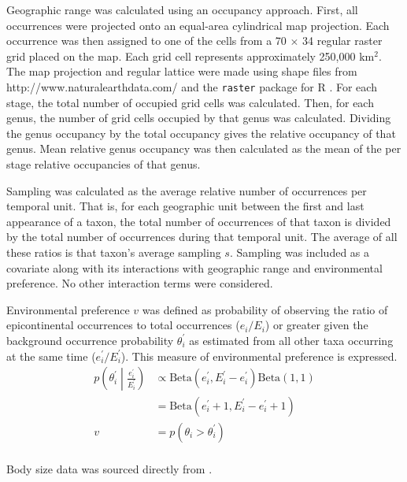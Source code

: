 \documentclass[12pt,letterpaper]{article}
\begin{document}
Geographic range was calculated using an occupancy approach. First, all occurrences were projected onto an equal-area cylindrical map projection. Each occurrence was then assigned to one of the cells from a 70 \(\times\) 34 regular raster grid placed on the map. Each grid cell represents approximately 250,000 km\(^{2}\). The map projection and regular lattice were made using shape files from http://www.naturalearthdata.com/ and the \texttt{raster} package for R \citep{raster}. For each stage, the total number of occupied grid cells was calculated. Then, for each genus, the number of grid cells occupied by that genus was calculated. Dividing the genus occupancy by the total occupancy gives the relative occupancy of that genus. Mean relative genus occupancy was then calculated as the mean of the per stage relative occupancies of that genus. 

Sampling was calculated as the average relative number of occurrences per temporal unit. That is, for each geographic unit between the first and last appearance of a taxon, the total number of occurrences of that taxon is divided by the total number of occurrences during that temporal unit. The average of all these ratios is that taxon's average sampling \(s\). Sampling was included as a covariate along with its interactions with geographic range and environmental preference. No other interaction terms were considered.

Environmental preference \(v\) was defined as probability of observing the ratio of epicontinental occurrences to total occurrences (\(e_{i} / E_{i}\)) or greater given the background occurrence probability \(\theta^{\prime}_{i}\) as estimated from all other taxa occurring at the same time (\(e^{\prime}_{i} / E^{\prime}_{i}\)). This measure of environmental preference is expressed.
\begin{equation}
  \begin{aligned}
    p\left(\theta^{\prime}_{i} \middle| \frac{e^{\prime}_{i}}{E^{\prime}_{i}}\right) &\propto \mathrm{Beta}(e^{\prime}_{i}, E^{\prime}_{i} - e^{\prime}_{i}) \mathrm{Beta}(1, 1) \\
    &= \mathrm{Beta}(e^{\prime}_{i} + 1, E^{\prime}_{i} - e^{\prime}_{i} + 1) \\
    v &= p(\theta_{i} > \theta^{\prime}_{i}) \\
  \end{aligned}
  \label{eq:envpref}
\end{equation}

Body size data was sourced directly from \citet{Payne2014}.
\end{document}

